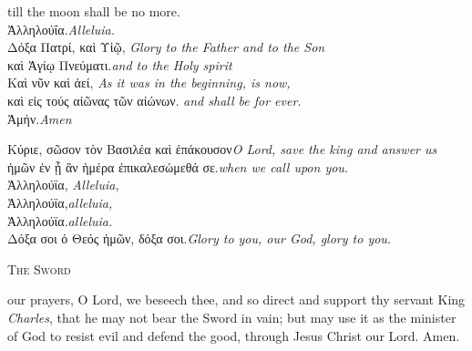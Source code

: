 {{ till the moon shall be no more.}\\\hellenic
 Ἀλληλούΐα.\hfill\normalfont\textit{Alleluia.}\\\hellenic
Δόξα Πατρί, καὶ Υἱῷ, \hfill\normalfont\textit{
Glory to the Father and to the Son}\\\hellenic  καὶ Ἁγίῳ Πνεύματι.\hfill\normalfont\textit{and to the Holy spirit}\\\hellenic
 Καὶ νῦν καὶ ἀεί, \hfill\normalfont\textit{As it was in the beginning, is now,}\\\hellenic καὶ εἰς τούς αἰῶνας τῶν αἰώνων.\hfill\normalfont\textit{ and shall be for ever.}\\\hellenic
 Ἀμήν.\hfill\normalfont\textit{Amen}




\hellenic Κύριε, σῶσον τὸν Βασιλέα καὶ ἐπάκουσον\hfill\normalfont\textit{O Lord, save the king and answer us}\\\hellenic
ἡμῶν ἐν ᾗ ἂν ἡμέρα ἐπικαλεσώμεθά σε.\hfill\normalfont\textit{when we call upon you.}\\\hellenic Ἀλληλούϊα,
\hfill\normalfont\textit{Alleluia,}\\\hellenic Ἀλληλούϊα,\hfill\normalfont\textit{alleluia,}\\\hellenic Ἀλληλούϊα.\hfill\normalfont\textit{alleluia.}\\\hellenic Δόξα σοι ὁ Θεός ἡμῶν, δόξα σοι.\hfill\normalfont\textit{Glory to you, our God, glory to you.}

\normalfont 

\begin{center}\scshape\color{qred} The Sword\end{center}








 our prayers, O Lord, we beseech thee,
and so direct and support thy servant King \textit{Charles},
that he may not bear the Sword in vain;
but may use it as the minister of God
to resist evil and defend the good,
through Jesus Christ our Lord. Amen.






}

